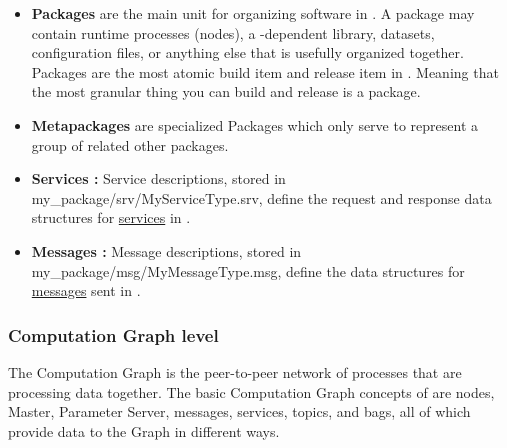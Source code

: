 \begin{itemize}

\item \textbf{Packages} are the main unit for organizing software in \ros. 
	A package may contain \ros runtime processes (nodes), a \ros-dependent library, datasets, configuration files, or anything else that is usefully organized together. 
	Packages are the most atomic build item and release item in \ros. Meaning that the most granular thing you can build and release is a package.

\item \textbf{Metapackages} are specialized Packages which only serve to represent a group of related other packages. 


\item \textbf{Services : }
Service descriptions, stored in my\_package/srv/MyServiceType.srv, define the request and response data structures for  \href{http://wiki.ros.org/Services}{services} in \ros.

\item \textbf{Messages : }  
Message descriptions, stored in my\_package/msg/MyMessageType.msg, define the data structures for  \href{http://wiki.ros.org/Messages}{messages} sent in \ros.


\end{itemize}


\subsubsection{Computation Graph level}
The Computation Graph is the peer-to-peer network of \ros processes that are processing data together. The basic Computation Graph concepts of \ros are nodes, Master, Parameter Server, messages, services, topics, and bags, all of which provide data to the Graph in different ways.

